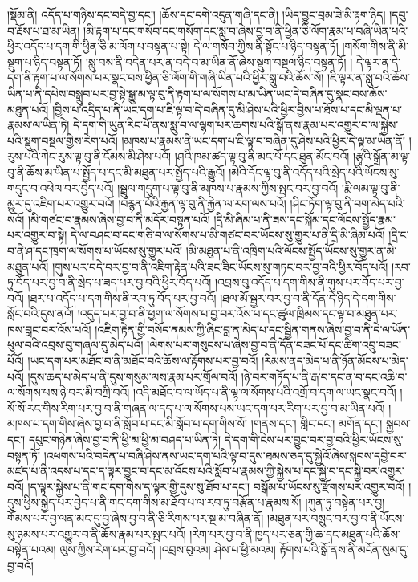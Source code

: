 །སྡོམ་ནི། འདོད་པ་གཉིས་དང་བདེ་བྱ་དང་། །ཆོས་དང་དགེ་འདུན་གཞི་དང་ནི། །ཡིད་བྱུང་བྲམ་ཟེ་མི་རྟག་ཉིད། །དབུ་བ་རྡོས་པ་ཐ་མ་ཡིན། །མི་རྟག་པ་དང་གསོབ་དང་གསོག་དང་སླུ་བ་ཞེས་བྱ་བ་ནི་ཕྱིན་ཅི་ལོག་རྣམ་པ་བཞི་ཡིན་པའི་ཕྱིར་འདོད་པ་དག་གི་ཕྱིན་ཅི་མ་ལོག་པ་བསྟན་པ་སྟེ། དེ་ལ་གསོབ་ཀྱིས་ནི་སྟོང་པ་ཉིད་བསྟན་ཏོ། །གསོག་གིས་ནི་མི་སྡུག་པ་ཉིད་བསྟན་ཏོ། །སླུ་བས་ནི་བདེན་པར་ན་བདེ་བ་མ་ཡིན་ནོ་ཞེས་སྡུག་བསྔལ་ཉིད་བསྟན་ཏོ། །
དེ་ལྟར་ན་དེ་དག་ནི་རྟག་པ་ལ་སོགས་པར་སྣང་བས་ཕྱིན་ཅི་ལོག་གི་གཞི་ཡིན་པའི་ཕྱིར་སླུ་བའི་ཆོས་སོ། །ཇི་ལྟར་ན་སླུ་བའི་ཆོས་ཡིན་པ་ནི་དཔེས་བསྒྲུབ་པར་བྱ་སྟེ་སྒྱུ་མ་ལྟ་བུ་ནི་རྟག་པ་ལ་སོགས་པ་མ་ཡིན་ཡང་དེ་བཞིན་དུ་སྣང་བས་ཆོས་མཐུན་པའོ། །བྱིས་པ་འདྲིད་པ་ནི་ཡང་དག་པ་ཇི་ལྟ་བ་དེ་བཞིན་དུ་མི་ཤེས་པའི་ཕྱིར་བྱིས་པ་ཐོས་པ་དང་མི་ལྡན་པ་རྣམས་ལ་ཡིན་ཏེ། དེ་དག་གི་ཡུན་རིང་པོ་ནས་སླུ་བ་ལ་ལྷག་པར་ཆགས་པའི་སྒོ་ནས་རྣམ་པར་འགྱུར་བ་ལ་སྐྱེས་པའི་སྡུག་བསྔལ་གྱིས་རེག་པའོ། །མཁས་པ་རྣམས་ནི་ཡང་དག་པ་ཇི་ལྟ་བ་བཞིན་དུ་ཤེས་པའི་ཕྱིར་དེ་ལྟ་མ་ཡིན་ནོ། །རུས་པའི་ཀེང་རུས་ལྟ་བུ་ནི་ངོམས་མི་ཤེས་པའོ། །ཤའི་ཁམ་ཚད་ལྟ་བུ་ནི་མང་པོ་དང་ཐུན་མོང་བའོ། །རྩྭའི་སྒྲོན་མ་ལྟ་བུ་ནི་ཆོས་མ་ཡིན་པ་སྤྱོད་པ་དང་མི་མཐུན་པར་སྤྱོད་པའི་རྒྱུའོ། །མེའི་དོང་ལྟ་བུ་ནི་འདོད་པའི་སྲེད་པའི་ཡོངས་སུ་གདུང་བ་འཕེལ་བར་བྱེད་པའོ། །སྦྲུལ་གདུག་པ་ལྟ་བུ་ནི་མཁས་པ་རྣམས་ཀྱིས་སྤང་བར་བྱ་བའོ། །རྨི་ལམ་ལྟ་བུ་ནི་མྱུར་དུ་འཇིག་པར་འགྱུར་བའོ། །བརྙན་པོའི་རྒྱན་ལྟ་བུ་ནི་རྐྱེན་ལ་རག་ལས་པའོ། །ཤིང་ཏོག་ལྟ་བུ་ནི་བག་མེད་པའི་སའོ། །མི་གཙང་བ་རྣམས་ཞེས་བྱ་བ་ནི་མདོར་བསྟན་པའོ། །དྲི་མི་ཞིམ་པ་ནི་ཟས་དང་སྐོམ་དང་ལོངས་སྤྱོད་རྣམ་པར་འགྱུར་བ་སྟེ། དེ་ལ་བཤང་བ་དང་གཅི་བ་ལ་སོགས་པ་མི་གཙང་བར་ཡོངས་སུ་གྱུར་པ་ནི་དྲི་མི་ཞིམ་པའོ། །དྲི་ང་བ་ནི་ཤ་དང་ཁྲག་ལ་སོགས་པ་ཡོངས་སུ་གྱུར་པའོ། །མི་མཐུན་པ་ནི་འཁྲིག་པའི་ལོངས་སྤྱོད་ཡོངས་སུ་གྱུར་ན་མི་མཐུན་པའོ། །གུས་པར་བདེ་བར་བྱ་བ་ནི་འཇིག་རྟེན་པའི་ཟང་ཟིང་ཡོངས་སུ་གཏང་བར་བྱ་བའི་ཕྱིར་བོད་པའོ། །རབ་ཏུ་བོད་པར་བྱ་བ་ནི་སྲེད་པ་ཟད་པར་བྱ་བའི་ཕྱིར་བོད་པའོ། །འབྲས་བུ་འདོད་པ་དག་གིས་ནི་གུས་པར་བོད་པར་བྱ་བའོ། །ཐར་པ་འདོད་པ་དག་གིས་ནི་རབ་ཏུ་བོད་པར་བྱ་བའོ། །ཐལ་མོ་སྦྱར་བར་བྱ་བ་ནི་དོན་དེ་ཉིད་དེ་དག་གིས་སློང་བའི་དུས་ནའོ། །འདུད་པར་བྱ་བ་ནི་ཕྱག་ལ་སོགས་པ་བྱ་བར་འོས་པ་དང་ཚུལ་ཁྲིམས་དང་ལྟ་བ་མཐུན་པར་ཁས་བླང་བར་འོས་པའོ། །འཇིག་རྟེན་གྱི་བསོད་ནམས་ཀྱི་ཞིང་བླ་ན་མེད་པ་དང་སྦྱིན་གནས་ཞེས་བྱ་བ་ནི་དེ་ལ་ཡོན་ཕུལ་བའི་འབྲས་བུ་གཞལ་དུ་མེད་པའོ། །ལེགས་པར་གསུངས་པ་ཞེས་བྱ་བ་ནི་དོན་བཟང་པོ་དང་ཚིག་འབྲུ་བཟང་པོའོ། །ཡང་དག་པར་མཐོང་བ་ནི་མཐོང་བའི་ཆོས་ལ་རྟོགས་པར་བྱ་བའོ། །རིམས་ནད་མེད་པ་ནི་ཉོན་མོངས་པ་མེད་པའོ། །དུས་ཆད་པ་མེད་པ་ནི་དུས་གསུམ་ལས་རྣམ་པར་གྲོལ་བའོ། །ཉེ་བར་གཏོད་པ་ནི་རྒ་བ་དང་ན་བ་དང་འཆི་བ་ལ་སོགས་པས་ཉེ་བར་མི་བཀྲི་བའོ། །འདི་མཐོང་བ་ལ་ཡོད་པ་ནི་ལྷ་ལ་སོགས་པའི་འགྲོ་བ་དག་ལ་ཡང་སྣང་བའོ། །སོ་སོ་རང་གིས་རིག་པར་བྱ་བ་ནི་གཞན་ལ་དད་པ་ལ་སོགས་པས་ཡང་དག་པར་རིག་པར་བྱ་བ་མ་ཡིན་པའོ། །མཁས་པ་དག་གིས་ཞེས་བྱ་བ་ནི་སློབ་པ་དང་མི་སློབ་པ་དག་གིས་སོ། །གནས་དང་། གླིང་དང་། མགོན་དང་། སྐྱབས་དང་། དཔུང་གཉེན་ཞེས་བྱ་བ་ནི་ཕྱི་མ་ཕྱི་མ་བཤད་པ་ཡིན་ཏེ། དེ་དག་གི་ངེས་པར་བྱུང་བར་བྱ་བའི་ཕྱིར་ཡོངས་སུ་བསྟན་ཏོ། །འཕགས་པའི་བདེན་པ་བཞི་ཤེས་ནས་ཡང་དག་པའི་ལྟ་བ་དུས་ཐམས་ཅད་དུ་སྐྱེའོ་ཞེས་སྐབས་དབྱེ་བར་མཛད་པ་ནི་འདས་པ་དང་ད་ལྟར་བྱུང་བ་དང་མ་འོངས་པའི་སློབ་པ་རྣམས་ཀྱི་སྐྱེས་པ་དང་སྐྱེ་བ་དང་སྐྱེ་བར་འགྱུར་བའོ། །ད་ལྟར་སྐྱེས་པ་ནི་གང་དག་གིས་ད་ལྟར་གྱི་དུས་སུ་ཐོབ་པ་དང་། བསྒོམ་པ་ཡོངས་སུ་རྫོགས་པར་འགྱུར་བའོ། །དུས་ཕྱིས་སྐྱེད་པར་བྱེད་པ་ནི་གང་དག་གིས་མ་ཐོབ་པ་ལ་རབ་ཏུ་བརྩོན་པ་རྣམས་སོ། །ཀུན་ཏུ་བསྟེན་པར་བྱ། གོམས་པར་བྱ་ལན་མང་དུ་བྱ་ཞེས་བྱ་བ་ནི་ཅི་རིགས་པར་སྔ་མ་བཞིན་ནོ། །མཐུན་པར་བསྲུང་བར་བྱ་བ་ནི་ཡོངས་སུ་ཉམས་པར་འགྱུར་བ་ནི་ཆོས་རྣམ་པར་སྤང་པའོ། །རེག་པར་བྱ་བ་ནི་ཁྱད་པར་ཅན་གྱི་ཆ་དང་མཐུན་པའི་ཆོས་བསྟེན་པའམ། ལུས་ཀྱིས་རེག་པར་བྱ་བའོ། །འབྲས་བུའམ། ཤེས་པ་ཕྱི་མའམ། རྟོགས་པའི་སྒོ་ནས་ནི་མངོན་སུམ་དུ་བྱ་བའོ། 